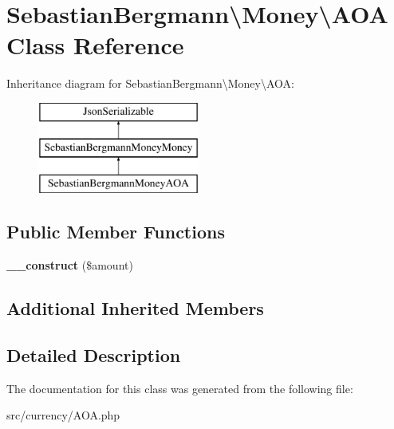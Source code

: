 \hypertarget{classSebastianBergmann_1_1Money_1_1AOA}{}\section{Sebastian\+Bergmann\textbackslash{}Money\textbackslash{}A\+O\+A Class Reference}
\label{classSebastianBergmann_1_1Money_1_1AOA}
Inheritance diagram for Sebastian\+Bergmann\textbackslash{}Money\textbackslash{}A\+O\+A\+:\begin{figure}[H]
\begin{center}
\leavevmode
\includegraphics[height=3.000000cm]{classSebastianBergmann_1_1Money_1_1AOA}
\end{center}
\end{figure}
\subsection*{Public Member Functions}
\begin{DoxyCompactItemize}
\item 
\hypertarget{classSebastianBergmann_1_1Money_1_1AOA_afeac34e5e6cbd40edcf1e9960a577480}{}{\bfseries \+\_\+\+\_\+construct} (\$amount)\label{classSebastianBergmann_1_1Money_1_1AOA_afeac34e5e6cbd40edcf1e9960a577480}

\end{DoxyCompactItemize}
\subsection*{Additional Inherited Members}


\subsection{Detailed Description}


The documentation for this class was generated from the following file\+:\begin{DoxyCompactItemize}
\item 
src/currency/A\+O\+A.\+php\end{DoxyCompactItemize}
